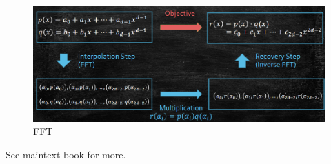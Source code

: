         


\begin{figure}
    \centering
    \includegraphics[width=0.8\linewidth]{Notes/fig/FFT.png}
    \caption{FFT}
    \label{fig:FFT}
\end{figure}
See maintext book for more.


            
